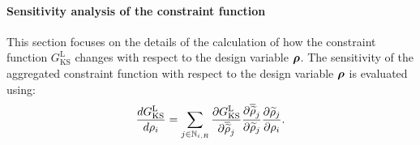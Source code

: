 \paragraph{Sensitivity analysis of the constraint function}
This section focuses on the details of the calculation of how the constraint function $G_{\text{KS}}^\text{L}$ changes with respect to the design variable $\bm{\rho}$. The sensitivity of the aggregated constraint function with respect to the design variable $\bm{\rho}$ is evaluated using:
\begin{equation} \label{eq:03_chain_sens_fin}
    \frac{d G_{\text{KS}}^\text{L}}{d \rho_i} = \sum_{j \in \mathbb{N}_{i,R}} \frac{\partial G_{\text{KS}}^\text{L}}{\partial\overline{\widetilde{\rho}}_j} \frac{\partial\overline{\widetilde{\rho}}_j}{\partial\widetilde{\rho}_j} \frac{\partial\widetilde{\rho}_j}{\partial\rho_i}.
\end{equation}

